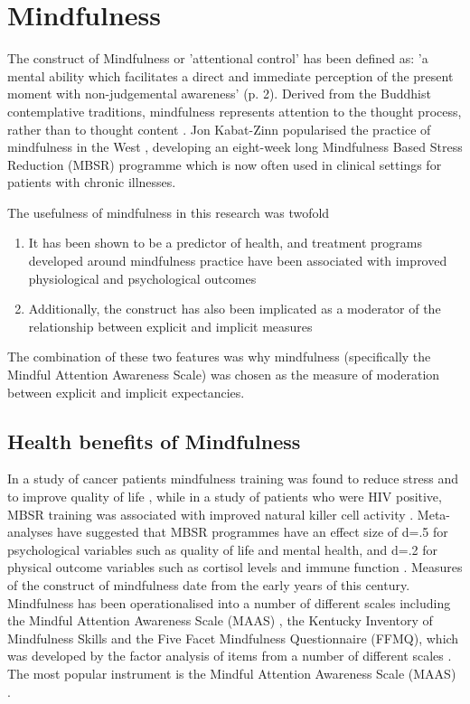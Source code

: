 \documentclass{article}
\begin{document}
\section{Mindfulness}

The construct of Mindfulness or 'attentional control' has been defined as: 'a mental ability which facilitates a direct and 
immediate perception of the present moment with non-judgemental awareness' \cite{kohls2009facets} (p. 2). Derived from the Buddhist 
contemplative traditions, mindfulness represents attention to the thought process, rather than to thought content \cite{brown2007addressing}. 
Jon Kabat-Zinn popularised the practice of mindfulness in the West \cite{Kabat-Zinn2003}, developing an eight-week 
long Mindfulness Based Stress Reduction (MBSR) programme which is now often used in clinical settings for patients with chronic illnesses. 

The usefulness of mindfulness in this research was twofold
\begin{enumerate}
\item It has been shown to be a predictor of health, and treatment programs developed around mindfulness practice have been associated with improved physiological and psychological outcomes

\item Additionally, the construct has also been implicated as a moderator of the relationship between explicit and implicit measures \cite{Levesque2007}
\end{enumerate}

The combination of these two features was why mindfulness (specifically the Mindful Attention Awareness Scale) was chosen as the measure of moderation between explicit and implicit expectancies. 

\subsection{Health benefits of Mindfulness}
\label{sec:health-benef-mindf}



In a study of cancer patients mindfulness training was found to reduce stress and to improve quality of life \cite{Carlson2007}, 
while in a study of patients who were HIV positive, MBSR training was associated with improved natural killer cell activity 
\cite{Robinson2003}. Meta-analyses have suggested that MBSR programmes have an effect size of d=.5 for psychological variables 
such as quality of life and mental health, and d=.2 for physical outcome variables such as cortisol levels and immune function \cite{Grossman2004}.
Measures of the construct of mindfulness date from the early years of this century. Mindfulness has been operationalised 
into a number of different scales including the Mindful Attention Awareness Scale (MAAS) \cite{brown2003benefits} , 
the Kentucky Inventory of Mindfulness Skills \cite{Ruth2004} and the Five Facet Mindfulness Questionnaire (FFMQ), 
which was developed by the factor analysis of items from a number of different scales \cite{Ruth2006}. The most popular instrument is
 the Mindful Attention Awareness Scale (MAAS) \cite{brown2003benefits}.
\end{document}
